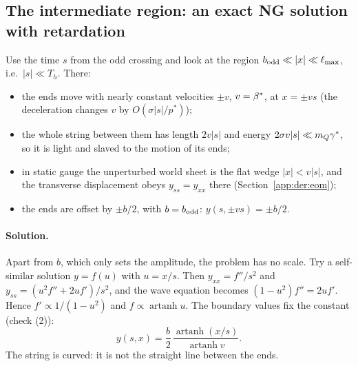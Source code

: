 \subsection{The intermediate region: an exact NG solution with retardation}\label{app:der:wedge}
Use the time $s$ from the odd crossing and look at the region $b_{\rm odd}\ll|x|\ll\ell_{\max}$, i.e.\ $|s|\ll T_h$. There:
\begin{itemize}
\item the ends move with nearly constant velocities $\pm v$, $v=\beta^*$, at $x=\pm vs$ (the deceleration changes $v$ by
  $O(\sigma|s|/p^*)$);
\item the whole string between them has length $2v|s|$ and energy $2\sigma v|s|\ll m_Q\gamma^*$, so it is light and slaved to
  the motion of its ends;
\item in static gauge the unperturbed world sheet is the flat wedge $|x|<v|s|$, and the transverse displacement obeys
  $y_{ss}=y_{xx}$ there (Section~\ref{app:der:eom});
\item the ends are offset by $\pm b/2$, with $b=b_{\rm odd}$: $y(s,\pm vs)=\pm b/2$.
\end{itemize}

\paragraph{Solution.} Apart from $b$, which only sets the amplitude, the problem has no scale. Try a self-similar
solution $y=f(u)$ with $u=x/s$. Then $y_{xx}=f''/s^2$ and $y_{ss}=(u^2f''+2uf')/s^2$, and the wave equation becomes
$(1-u^2)f''=2uf'$. Hence $f'\propto1/(1-u^2)$ and $f\propto\operatorname{artanh}u$. The boundary values fix the
constant (check  (2)):
\begin{equation}
  y(s,x)=\frac b2\,\frac{\operatorname{artanh}(x/s)}{\operatorname{artanh}v}.
  \label{eq:D:wedge}
\end{equation}
The string is curved: it is not the straight line between the ends.

